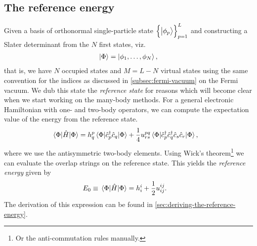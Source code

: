         \subsection{The reference energy}
            \label{subsec:reference-energy}
            Given a basis of orthonormal single-particle state
            $\left\{ \ket{\phi_p} \right\}_{p = 1}^{L}$ and constructing a Slater
            determinant from the $N$ first states, viz.
            \begin{align}
                \ket{\Phi} = \ket{\phi_1, \dots, \phi_N},
            \end{align}
            that is, we have $N$ occupied states and $M = L - N$ virtual states
            using the same convention for the indices as discussed in
            \autoref{subsec:fermi-vacuum} on the Fermi vacuum.
            We dub this state the \emph{reference state} for reasons which will
            become clear when we start working on the many-body methods.
            For a general electronic Hamiltonian with one- and two-body
            operators, we can compute the expectation value of the energy from
            the reference state.
            \begin{align}
                \mel{\Phi}{\hat{H}}{\Phi}
                &=
                h^{p}_{q}
                \mel{\Phi}{\hat{c}_{p}^{\dagger}\hat{c}_{q}}{\Phi}
                + \frac{1}{4}
                u^{pq}_{rs}
                \mel{\Phi}{\hat{c}_{p}^{\dagger}\hat{c}_{q}^{\dagger}\hat{c}_{s}\hat{c}_{r}}{\Phi},
            \end{align}
            where we use the antisymmetric two-body elements.
            Using Wick's theorem\footnote{%
                Or the anti-commutation rules manually.
            } we can evaluate the overlap strings on the reference state.
            This yields the \emph{reference energy} given by
            \begin{align}
                E_{0}
                &\equiv
                \mel{\Phi}{\hat{H}}{\Phi}
                =
                h^{i}_{i}
                + \frac{1}{2}u^{ij}_{ij}.
                \label{eq:reference-energy}
            \end{align}
            The derivation of this expression can be found in
            \autoref{sec:deriving-the-reference-energy}.

